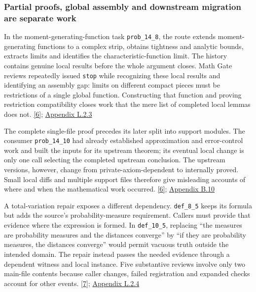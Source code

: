 \subsubsection[Partial proofs, global assembly and downstream migration are separate work]{\texorpdfstring{\protect\hypertarget{r3-2}{}Partial proofs, global assembly and downstream migration are separate work}{Partial proofs, global assembly and downstream migration are separate work}}
In the moment-generating-function task \nolinkurl{prob_14_8}, the route extends moment-generating functions to a complex strip, obtains tightness and analytic bounds, extracts limits and identifies the characteristic-function limit. The history contains genuine local results before the whole argument closes. Math Gate reviews repeatedly issued \nolinkurl{stop} while recognizing these local results and identifying an assembly gap: limits on different compact pieces must be restrictions of a single global function. Constructing that function and proving restriction compatibility closes work that the mere list of completed local lemmas does not. \href{en.pdf\#ref-6}{\mbox{[6]}}; \href{en-appendix.pdf\#l2-3}{Appendix L.2.3}

The complete single-file proof precedes its later split into support modules. The consumer \nolinkurl{prob_14_10} had already established approximation and error-control work and built the inputs for its upstream theorem; its eventual local change is only one call selecting the completed upstream conclusion. The upstream versions, however, change from private-axiom-dependent to internally proved. Small local diffs and multiple support files therefore give misleading accounts of where and when the mathematical work occurred. \href{en.pdf\#ref-6}{\mbox{[6]}}; \href{en-appendix.pdf\#b10}{Appendix B.10}

A total-variation repair exposes a different dependency. \nolinkurl{def_8_5} keeps its formula but adds the source's probability-measure requirement. Callers must provide that evidence where the expression is formed. In \nolinkurl{def_10_5}, replacing “the measures are probability measures and the distances converge” by “if they are probability measures, the distances converge” would permit vacuous truth outside the intended domain. The repair instead passes the needed evidence through a dependent witness and local instance. Five substantive reviews involve only two main-file contents because caller changes, failed registration and expanded checks account for other events. \href{en.pdf\#ref-7}{\mbox{[7]}}; \href{en-appendix.pdf\#l2-4}{Appendix L.2.4}

